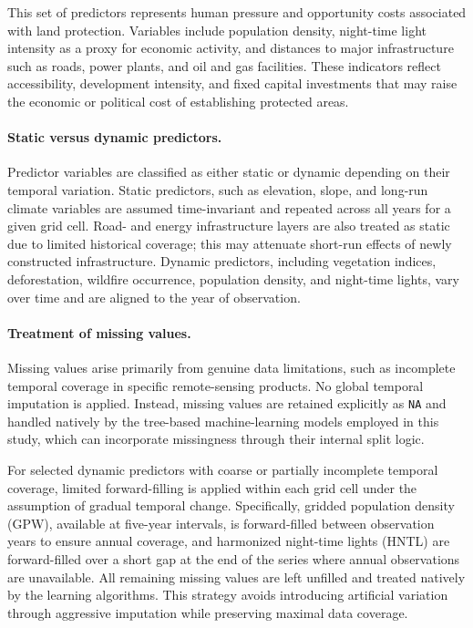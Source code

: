 \documentclass[12pt]{article}
\theoremstyle{break} %
\begin{document}
This set of predictors represents human pressure and opportunity costs associated with land protection. Variables include population density, night-time light intensity as a proxy for economic activity, and distances to major infrastructure such as roads, power plants, and oil and gas facilities. These indicators reflect accessibility, development intensity, and fixed capital investments that may raise the economic or political cost of establishing protected areas.

\paragraph{Static versus dynamic predictors.}

Predictor variables are classified as either static or dynamic depending on their temporal variation. Static predictors, such as elevation, slope, and long-run climate variables are assumed time-invariant and repeated across all years for a given grid cell. Road- and energy infrastructure layers are also treated as static due to limited historical coverage; this may attenuate short-run effects of newly constructed infrastructure. Dynamic predictors, including vegetation indices, deforestation, wildfire occurrence, population density, and night-time lights, vary over time and are aligned to the year of observation.

\paragraph{Treatment of missing values.}

Missing values arise primarily from genuine data limitations, such as incomplete temporal coverage in specific remote-sensing products. No global temporal imputation is applied. Instead, missing values are retained explicitly as \texttt{NA} and handled natively by the tree-based machine-learning models employed in this study, which can incorporate missingness through their internal split logic.

For selected dynamic predictors with coarse or partially incomplete temporal coverage, limited forward-filling is applied within each grid cell under the assumption of gradual temporal change. Specifically, gridded population density (GPW), available at five-year intervals, is forward-filled between observation years to ensure annual coverage, and harmonized night-time lights (HNTL) are forward-filled over a short gap at the end of the series where annual observations are unavailable. All remaining missing values are left unfilled and treated natively by the learning algorithms. This strategy avoids introducing artificial variation through aggressive imputation while preserving maximal data coverage.
\end{document}
